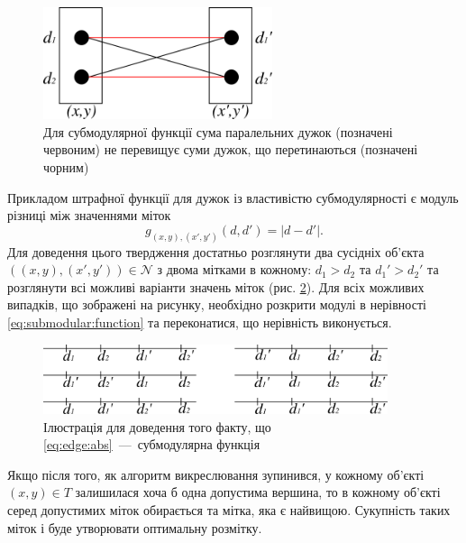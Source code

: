 \begin{figure}[h]
  \centering
  \includegraphics[width=0.6\textwidth]{images/submodular_function}
  \caption{Для субмодулярної функції сума паралельних дужок (позначені червоним)
           не перевищує суми дужок, що перетинаються (позначені чорним)}
  \label{fig:submodular:function}
\end{figure}

Прикладом штрафної функції для дужок із властивістю субмодулярності
є модуль різниці між значеннями міток
\begin{equation} \label{eq:edge:abs}
    g_{\left(x, y \right), \left(x', y' \right)} \left( d, d' \right)
    = \left| d - d' \right|.
\end{equation}
Для доведення цього твердження достатньо розглянути два сусідніх об'єкта
$\left(\left(x, y \right), \left(x', y' \right) \right) \in \mathcal{N}$
з двома мітками в кожному: $d_1 > d_2$ та $d_1' > d_2'$
та розглянути всі можливі варіанти значень міток
(рис. \ref{fig:submodularity:abs:proof}).
Для всіх можливих випадків, що зображені на рисунку,
необхідно розкрити модулі в нерівності \eqref{eq:submodular:function}
та переконатися, що нерівність виконується.

\begin{figure}[h]
  \centering
  \includegraphics[width=0.9\textwidth]{images/submodularity_abs_proof}
  \caption{Ілюстрація для доведення того факту,
           що \eqref{eq:edge:abs}~---~субмодулярна функція}
  \label{fig:submodularity:abs:proof}
\end{figure}

Якщо після того, як алгоритм викреслювання зупинився,
у кожному об'єкті $\left(x, y \right) \in T$
залишилася хоча б одна допустима вершина,
то в кожному об'єкті серед допустимих міток обирається та мітка, яка є найвищою.
Сукупність таких міток і буде утворювати оптимальну розмітку.

